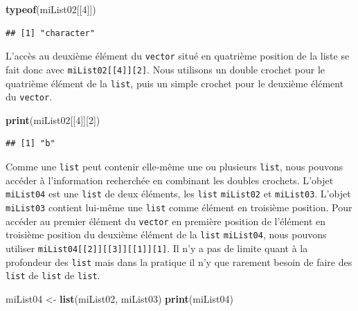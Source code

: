 \documentclass[
]{book}
\newenvironment{Shaded}{\begin{snugshade}}{\end{snugshade}}
\newcommand{\DecValTok}[1]{\textcolor[rgb]{0.00,0.00,0.81}{#1}}
\newcommand{\KeywordTok}[1]{\textcolor[rgb]{0.13,0.29,0.53}{\textbf{#1}}}
\newcommand{\NormalTok}[1]{#1}
\newcommand{\StringTok}[1]{\textcolor[rgb]{0.31,0.60,0.02}{#1}}
\begin{document}
\begin{Shaded}
\begin{Highlighting}[]
\KeywordTok{typeof}\NormalTok{(miList02[[}\DecValTok{4}\NormalTok{]])}
\end{Highlighting}
\end{Shaded}

\begin{verbatim}
## [1] "character"
\end{verbatim}

L'accès au deuxième élément du \texttt{vector} situé en quatrième position de la liste se fait donc avec \texttt{miList02{[}{[}4{]}{]}{[}2{]}}. Nous utilisons un double crochet pour le quatrième élément de la \texttt{list}, puis un simple crochet pour le deuxième élément du \texttt{vector}.

\begin{Shaded}
\begin{Highlighting}[]
\KeywordTok{print}\NormalTok{(miList02[[}\DecValTok{4}\NormalTok{]][}\DecValTok{2}\NormalTok{])}
\end{Highlighting}
\end{Shaded}

\begin{verbatim}
## [1] "b"
\end{verbatim}

Comme une \texttt{list} peut contenir elle-même une ou plusieurs \texttt{list}, nous pouvons accéder à l'information recherchée en combinant les doubles crochets. L'objet \texttt{miList04} est une \texttt{list} de deux éléments, les \texttt{list} \texttt{miList02} et \texttt{miList03}. L'objet \texttt{miList03} contient lui-même une \texttt{list} comme élément en troisième position. Pour accéder au premier élément du \texttt{vector} en première position de l'élément en troisième position du deuxième élément de la \texttt{list} \texttt{miList04}, nous pouvons utiliser \texttt{miList04{[}{[}2{]}{]}{[}{[}3{]}{]}{[}{[}1{]}{]}{[}1{]}}. Il n'y a pas de limite quant à la profondeur des \texttt{list} mais dans la pratique il n'y que rarement besoin de faire des \texttt{list} de \texttt{list} de \texttt{list}.

\begin{Shaded}
\begin{Highlighting}[]
\NormalTok{miList04 <-}\StringTok{ }\KeywordTok{list}\NormalTok{(miList02, miList03)}
\KeywordTok{print}\NormalTok{(miList04)}
\end{Highlighting}
\end{Shaded}
\end{document}
